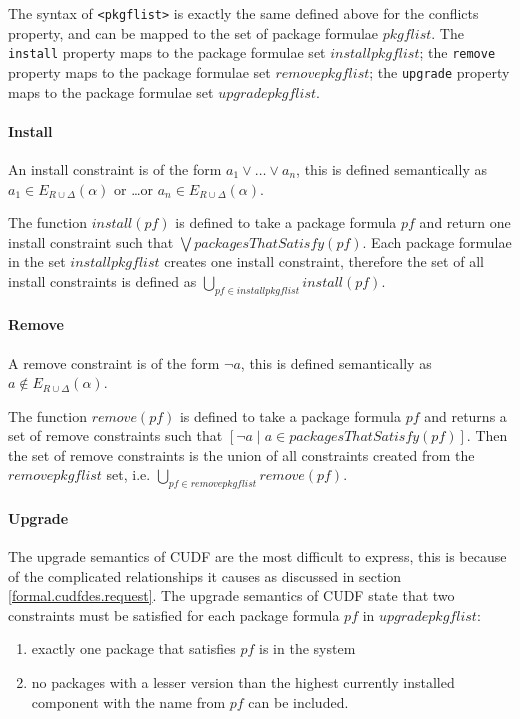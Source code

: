The syntax of \verb+<pkgflist>+ is exactly the same defined above for the conflicts property, and can be mapped to the set of package formulae $pkgflist$.
The \verb+install+ property maps to the package formulae set $installpkgflist$; the \verb+remove+ property maps to the package formulae set $removepkgflist$;
the \verb+upgrade+ property maps to the package formulae set  $upgradepkgflist$.

\paragraph{Install}
An install constraint is of the form $a_1 \vee \ldots \vee a_n$,
this is defined semantically as $a_1 \in E_{R \cup \Delta}(\alpha)$ or \ldots or $a_n \in E_{R \cup \Delta}(\alpha)$.

The function  $install(pf)$ is defined to take a package formula $pf$ and return one install constraint such that $\bigvee packagesThatSatisfy(pf)$.
Each package formulae in the set $installpkgflist$ creates one install constraint,
therefore the set of all install constraints is defined as $\bigcup \limits_{pf \in installpkgflist} install(pf)$.

\paragraph{Remove}
A remove constraint is of the form $\neg a$,
this is defined semantically as $a \not \in E_{R \cup \Delta}(\alpha)$.

The function $remove(pf)$ is defined to take a package formula $pf$ and returns a set of remove constraints such that $[\neg a \mid  a \in packagesThatSatisfy(pf)]$.
Then the set of remove constraints is the union of all constraints created from the $removepkgflist$ set, i.e. $\bigcup \limits_{pf \in removepkgflist} remove(pf)$.

\paragraph{Upgrade}
The upgrade semantics of CUDF are the most difficult to express, this is because of the complicated relationships it causes as discussed in section \ref{formal.cudfdes.request}.
The upgrade semantics of CUDF state that two constraints must be satisfied for each package formula $pf$ in $upgradepkgflist$:
\begin{enumerate}
  \item exactly one package that satisfies $pf$ is in the system
  \item no packages with a lesser version than the highest currently installed component with the name from $pf$ can be included.
\end{enumerate} 

